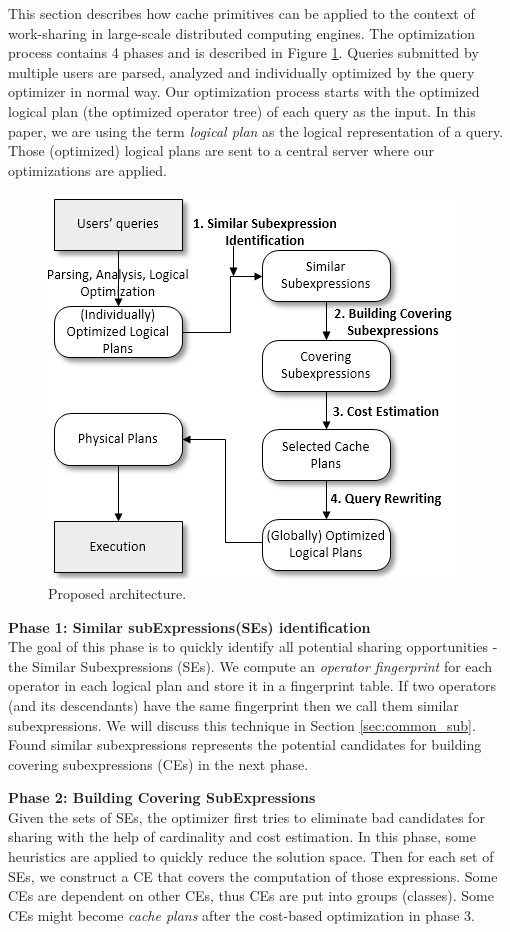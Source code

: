 This section describes how cache primitives can be applied to the context of work-sharing in large-scale distributed computing engines. The optimization process contains 4 phases and is described in Figure \ref{fig:phases_mqo}. Queries submitted by multiple users are parsed, analyzed and individually optimized by the query optimizer in normal way. Our optimization process starts with the optimized logical plan (the optimized operator tree) of each query as the input. In this paper, we are using the term \emph{logical plan} as the logical representation of a query. Those (optimized) logical plans are sent to a central server where our optimizations are applied.
\begin{figure}[!htb]
	\centering
 	\includegraphics[scale=0.7]{figures/phases_mqo}
   	\caption{Proposed architecture.} 
   	\label{fig:phases_mqo}
\end{figure}
\textbf{Phase 1: Similar subExpressions(SEs) identification}\\
The goal of this phase is to quickly identify all potential sharing opportunities - the Similar Subexpressions (SEs). We compute an \emph{operator fingerprint} for each operator in each logical plan and store it in a fingerprint table. If two operators (and its descendants) have the same fingerprint then we call them similar subexpressions. We will discuss this technique in Section \ref{sec:common_sub}. Found similar subexpressions represents the potential candidates for building covering subexpressions (CEs) in the next phase.

\textbf{Phase 2: Building Covering SubExpressions}\\
Given the sets of SEs, the optimizer first tries to eliminate bad candidates for sharing with the help of cardinality and cost estimation. In this phase, some heuristics are applied to quickly reduce the solution space. Then for each set of SEs, we construct a CE that covers the computation of those expressions. Some CEs are dependent on other CEs, thus CEs are put into groups (classes). Some CEs might become \emph{cache plans} after the cost-based optimization in phase 3.

